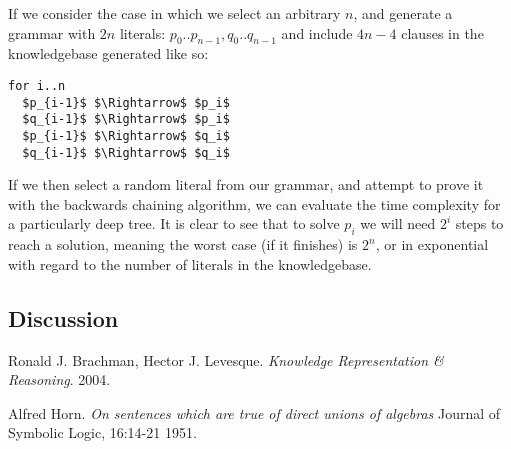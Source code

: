 \documentclass{article}
\begin{document}
If we consider the case in which we select an arbitrary $n$, and generate a grammar 
with $2n$ literals: $p_0 .. p_{n-1}, q_0 .. q_{n-1}$ and include $4n-4$ clauses in the knowledgebase
generated like so:

\begin{lstlisting}[mathescape=true]
for i..n
  $p_{i-1}$ $\Rightarrow$ $p_i$
  $q_{i-1}$ $\Rightarrow$ $p_i$
  $p_{i-1}$ $\Rightarrow$ $q_i$
  $q_{i-1}$ $\Rightarrow$ $q_i$
\end{lstlisting}

If we then select a random literal from our grammar, and attempt to prove it
with the backwards chaining algorithm, we can evaluate the time complexity for a
particularly deep tree. It is clear to see that to solve $p_i$ we will need $2^i$ 
steps to reach a solution, meaning the worst case (if it finishes) is $2^n$, or
in exponential with regard to the number of literals in the knowledgebase.

\subsection{Discussion}

\begin{thebibliography}{9}

  Ronald J. Brachman, Hector J. Levesque.
  \emph{Knowledge Representation \& Reasoning}.
  2004.

  Alfred Horn.
  \emph{On sentences which are true of direct unions of algebras}
  Journal of Symbolic Logic, 16:14-21
  1951.
\end{thebibliography}
\end{document}
